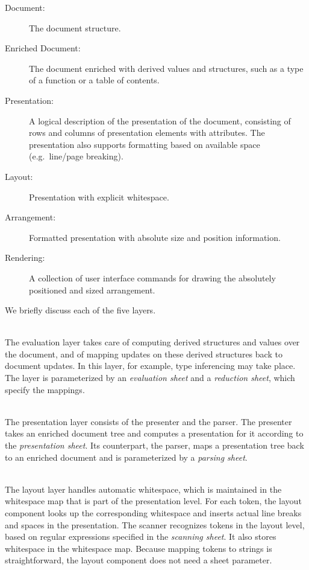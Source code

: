 \documentclass[12pt]{article}
\begin{document}
\begin{description}
\item[Document:] The document structure.

\item[Enriched Document:] The document enriched with derived values and structures, such as a type of a function or a table of contents. %

\item[Presentation:] A logical description of the presentation of the document, consisting of rows and columns of presentation elements with attributes. The presentation also supports formatting based on available space (e.g.\ line/page breaking).

\item[Layout:]  Presentation with explicit whitespace.

\item[Arrangement:] Formatted presentation with absolute size and position information.

\item[Rendering:] A collection of user interface commands for drawing the absolutely positioned and sized arrangement.
\end{description}

We briefly discuss each of the five layers.

\\
The evaluation layer takes care of computing derived structures and values over the document, and of mapping updates on these derived structures back to document updates. In this layer, for example, type inferencing may take place. The layer is parameterized by an {\em evaluation sheet} and a {\em reduction sheet}, which specify the mappings. 

\\
The presentation layer consists of the presenter and the parser. The presenter takes an enriched document tree and computes a presentation for it according to the {\em presentation sheet}. Its counterpart, the parser, maps a presentation tree back to an enriched document and is parameterized by a {\em parsing sheet}.

\\
The layout layer handles automatic whitespace, which is maintained in the whitespace map that is part of the presentation level. For each token, the layout component looks up the corresponding whitespace and inserts actual line breaks and spaces in the presentation. The scanner recognizes tokens in the layout level, based on regular expressions specified in the {\em scanning sheet}. It also stores whitespace in the whitespace map. Because mapping tokens to strings is straightforward, the layout component does not need a sheet parameter.
\end{document}
